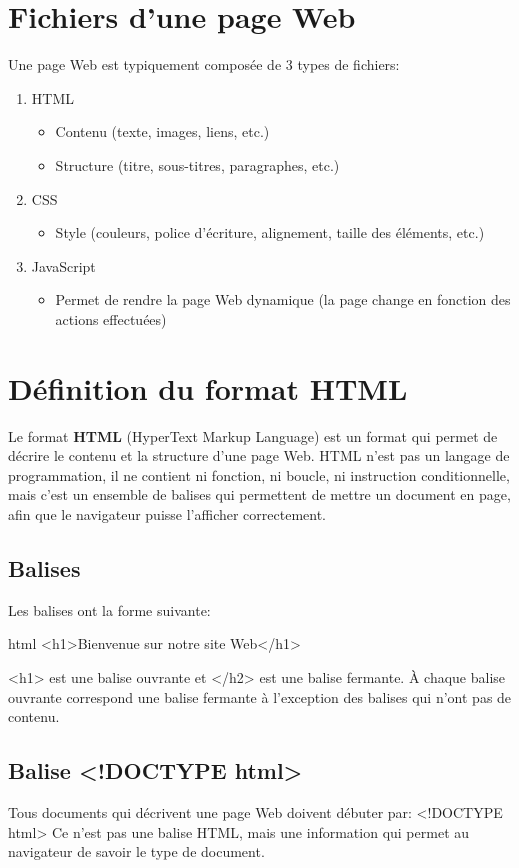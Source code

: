 \documentclass[a4paper,11pt]{article}
\begin{document}
\section{Fichiers d'une page Web}
Une page Web est typiquement composée de 3 types de fichiers:
\begin{enumerate}[label=\arabic*)]
\item HTML
\begin{itemize}
  \item Contenu (texte, images, liens, etc.)
  \item Structure (titre, sous-titres, paragraphes, etc.)
\end{itemize}
\item CSS
\begin{itemize}
  \item Style (couleurs, police d'écriture, alignement, taille des éléments, etc.)
\end{itemize}
\item JavaScript
\begin{itemize}
  \item Permet de rendre la page Web dynamique (la page change en fonction des actions effectuées)
\end{itemize}
\end{enumerate}

\section{Définition du format HTML}
Le format \textbf{HTML} (HyperText Markup Language) est un format qui permet de décrire le contenu et la structure d'une page Web. HTML n'est pas un langage de programmation, il ne contient ni fonction, ni boucle, ni instruction conditionnelle, mais c'est un ensemble de balises qui permettent de mettre un document en page, afin que le navigateur puisse l'afficher correctement.

\subsection{Balises}
Les balises ont la forme suivante:
\begin{code}{html}
<h1>Bienvenue sur notre site Web</h1>
\end{code}
<h1> est une balise ouvrante et </h2> est une balise fermante. À chaque balise ouvrante correspond une balise fermante à l'exception des balises qui n'ont pas de contenu.

\subsection{Balise <!DOCTYPE html>}
Tous documents qui décrivent une page Web doivent débuter par:  <!DOCTYPE html>
Ce n'est pas une balise HTML, mais une information qui permet au navigateur de savoir le type de document.
\end{document}
